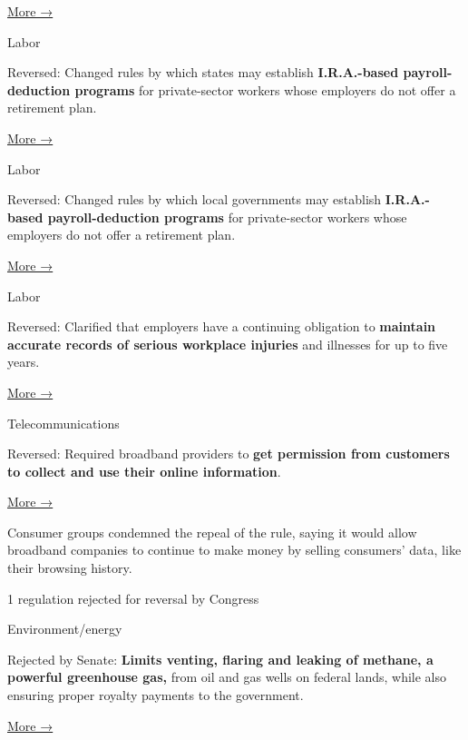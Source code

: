\href{https://www.nytimes3xbfgragh.onion/2017/03/09/us/every-student-succeeds-act-essa-congress.html}{More
→}

Labor

Reversed: Changed rules by which states may establish
\textbf{I.R.A.-based payroll-deduction programs} for private-sector
workers whose employers do not offer a retirement plan.

\href{https://www.nytimes3xbfgragh.onion/2017/03/03/upshot/state-ira-plans-are-ready-if-congress-doesnt-interfere.html}{More
→}

Labor

Reversed: Changed rules by which local governments may establish
\textbf{I.R.A.-based payroll-deduction programs} for private-sector
workers whose employers do not offer a retirement plan.

\href{https://www.nytimes3xbfgragh.onion/2017/03/03/upshot/state-ira-plans-are-ready-if-congress-doesnt-interfere.html}{More
→}

Labor

Reversed: Clarified that employers have a continuing obligation to
\textbf{maintain accurate records of serious workplace injuries} and
illnesses for up to five years.

\href{https://www.nytimes3xbfgragh.onion/2017/03/13/business/us-worker-safety-rules-osha.html}{More
→}

Telecommunications

Reversed: Required broadband providers to \textbf{get permission from
customers to collect and use their online information}.

\href{https://www.nytimes3xbfgragh.onion/2017/03/28/technology/congress-votes-to-overturn-obama-era-online-privacy-rules.html}{More
→}

Consumer groups condemned the repeal of the rule, saying it would allow
broadband companies to continue to make money by selling consumers'
data, like their browsing history.

1 regulation rejected for reversal by Congress

Environment/energy

Rejected by Senate: \textbf{Limits venting, flaring and leaking of
methane, a powerful greenhouse gas,} from oil and gas wells on federal
lands, while also ensuring proper royalty payments to the government.

\href{https://www.nytimes3xbfgragh.onion/2017/05/10/us/politics/regulations-methane-climate-change.html}{More
→}

